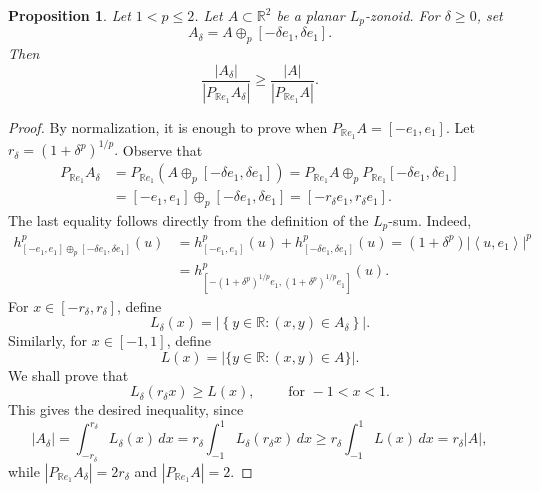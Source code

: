 \documentclass[11pt,a4paper]{amsart}
\theoremstyle{plain}
\newtheorem{prop}[theorem]{Proposition}
\theoremstyle{definition}
\newcommand{\R}{\mathbb R}
\begin{document}
\begin{prop}
\label{prop:horizontal-segment-planar-section}
Let $1<p\leq2$. Let $A\subset\R^2$ be a planar $L_p$-zonoid. For $\delta\geq0$, set
\[
    A_\delta=A\oplus_p[-\delta e_1,\delta e_1].
\]
Then
\[
    \frac{|A_\delta|}{|P_{\R e_1}A_\delta|}
    \geq
    \frac{|A|}{|P_{\R e_1}A|}.
\]
\end{prop}

\begin{proof}
By normalization, it is enough to prove when $P_{\R e_1}A=[-e_1,e_1]$.
Let $
    r_\delta=(1+\delta^p)^{1/p}.$ 
Observe that 
\begin{align}
    P_{\R e_1}A_\delta &=
    P_{\R e_1} ( A \oplus_p [-\delta e_1,\delta e_1])
    = 
    P_{\R e_1} A \oplus_p P_{\R e_1} [-\delta e_1,\delta e_1] 
    \\
    &= [-e_1,e_1] \oplus_p [-\delta e_1,\delta e_1] 
    = [-r_\delta e_1,r_\delta e_1].
\end{align}
The last equality follows directly from the definition of the $L_p$-sum. Indeed,
\begin{align}
h_{\left[-e_1, e_1\right] \oplus_p\left[-\delta e_1, \delta e_1\right]}^p (u) 
&=h_{\left[-e_1, e_1\right]}^p (u)+h_{\left[-\delta e_1, \delta e_1\right]}^p (u)=\left(1+\delta^p\right)\left|\left\langle u, e_1\right\rangle\right|^p 
\\
&= h_{[-(1+\delta^p)^{1/p}e_1,(1+\delta^p)^{1/p}e_1]}^p (u).
\end{align}
For $x \in\left[-r_\delta,r_\delta \right]$, define
$$
L_\delta(x)=\left|\left\{y \in \mathbb{R}:(x, y) \in A_\delta\right\}\right| .
$$
Similarly, for $x \in[-1,1]$, define
$$
L(x)=|\{y \in \mathbb{R}:(x, y) \in A\}| .
$$
We shall prove that
\begin{equation}
\label{eq:pointwise-chord-comparison}
    L_\delta(r_\delta x)\geq L(x),\qquad \text{ for }-1 < x<1.
\end{equation}
This gives  the desired inequality, since
\[
    |A_\delta|
    =\int_{-r_\delta}^{r_\delta}L_\delta(x)\,dx
    =r_\delta\int_{-1}^{1}L_\delta(r_\delta x)\,dx
    \geq r_\delta\int_{-1}^{1}L(x)\,dx
    =r_\delta |A|,
\]
while $|P_{\R e_1}A_\delta|=2r_\delta$ and $|P_{\R e_1}A|=2.$


\end{proof}
\end{document}
